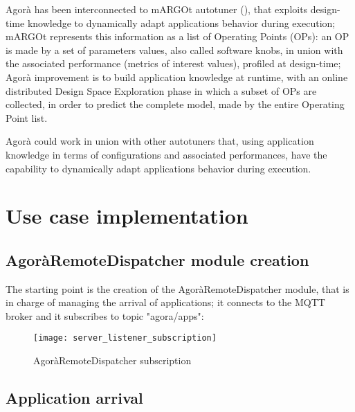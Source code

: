 Agorà has been interconnected to mARGOt autotuner (\cite{gadioli2015application}), that exploits design-time knowledge to dynamically adapt applications behavior during execution; mARGOt represents this information as a list of Operating Points (OPs): an OP is made by a set of parameters values, also called software knobs, in union with the associated performance (metrics of interest values), profiled at design-time; Agorà improvement is to build application knowledge at runtime, with an online distributed Design Space Exploration phase in which a subset of OPs are collected, in order to predict the complete model, made by the entire Operating Point list.

Agorà could work in union with other autotuners that, using application knowledge in terms of configurations and associated performances, have the capability to dynamically adapt applications behavior during execution.










\section{Use case implementation}





\subsection{AgoràRemoteDispatcher module creation}

The starting point is the creation of the AgoràRemoteDispatcher module, that is in charge of managing the arrival of applications; it connects to the MQTT broker and it subscribes to topic "agora/apps":

\begin{figure}[H]

    \centering
    \texttt{[image: server\_listener\_subscription]}
    \caption{AgoràRemoteDispatcher subscription}
    
\end{figure}





\subsection{Application arrival}

